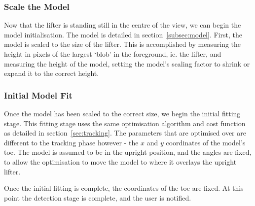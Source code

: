 \subsubsection{Scale the Model}
Now that the lifter is standing still in the centre of the view, we can begin the model initialisation. The model is detailed in section~\ref{subsec:model}. First, the model is scaled to the size of the lifter. This is accomplished by measuring the height in pixels of the largest `blob' in the foreground, ie. the lifter, and measuring the height of the model, setting the model's scaling factor to shrink or expand it to the correct height.

\subsubsection{Initial Model Fit}
Once the model has been scaled to the correct size, we begin the initial fitting stage. This fitting stage uses the same optimisation algorithm and cost function as detailed in section~\ref{sec:tracking}. The parameters that are optimised over are different to the tracking phase however - the $x$ and $y$ coordinates of the model's toe. The model is assumed to be in the upright position, and the angles are fixed, to allow the optimisation to move the model to where it overlays the upright lifter.

Once the initial fitting is complete, the coordinates of the toe are fixed. At this point the detection stage is complete, and the user is notified.